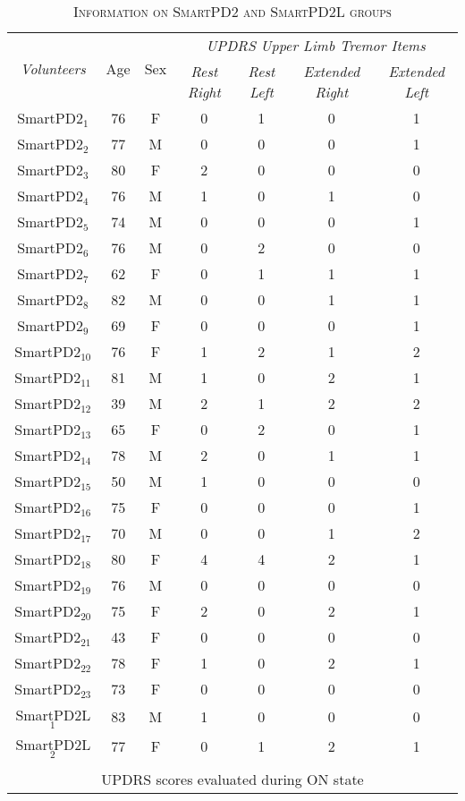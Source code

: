 \begin{table}[!hp]
\centering
\caption{\textsc{Information on SmartPD2 and SmartPD2L groups}}
\begin{tabular*}{1\textwidth}{@{\extracolsep{\fill}} c c c c c c c}
	\multirow{2}{*}{\textit{Volunteers}} & \multirow{2}{*}{Age} & \multirow{2}{*}{Sex} 
	& \multicolumn{4}{c}{\textit{UPDRS Upper Limb Tremor Items}} \\
	\cline{4-7}
	& & & \textit{Rest Right} & \textit{Rest Left} & \textit{Extended Right} & \textit{Extended Left} \\
	\hline 	\hline 
 	\gls{SmartPD2}$_{1}$ & 76 & F & 0 & 1 & 0 & 1 \\
 	\gls{SmartPD2}$_{2}$ & 77 & M & 0 & 0 & 0 & 1 \\
 	\gls{SmartPD2}$_{3}$ & 80 & F & 2 & 0 & 0 & 0 \\
 	\gls{SmartPD2}$_{4}$ & 76 & M & 1 & 0 & 1 & 0 \\
 	\gls{SmartPD2}$_{5}$ & 74 & M & 0 & 0 & 0 & 1 \\
 	\gls{SmartPD2}$_{6}$ & 76 & M & 0 & 2 & 0 & 0 \\
 	\gls{SmartPD2}$_{7}$ & 62 & F & 0 & 1 & 1 & 1 \\
 	\gls{SmartPD2}$_{8}$ & 82 & M & 0 & 0 & 1 & 1 \\
 	\gls{SmartPD2}$_{9}$ & 69 & F & 0 & 0 & 0 & 1 \\
 	\gls{SmartPD2}$_{10}$ & 76 & F & 1 & 2 & 1 & 2 \\
 	\gls{SmartPD2}$_{11}$ & 81 & M & 1 & 0 & 2 & 1 \\
 	\gls{SmartPD2}$_{12}$ & 39 & M & 2 & 1 & 2 & 2 \\
 	\gls{SmartPD2}$_{13}$ & 65 & F & 0 & 2 & 0 & 1 \\
 	\gls{SmartPD2}$_{14}$ & 78 & M & 2 & 0 & 1 & 1\\
 	\gls{SmartPD2}$_{15}$ & 50 & M & 1 & 0 & 0 & 0\\
 	\gls{SmartPD2}$_{16}$ & 75 & F & 0 & 0 & 0 & 1\\
 	\gls{SmartPD2}$_{17}$ & 70 & M & 0 & 0 & 1 & 2 \\
 	\gls{SmartPD2}$_{18}$ & 80 & F & 4 & 4 & 2 & 1 \\
 	\gls{SmartPD2}$_{19}$ & 76 & M & 0 & 0 & 0 & 0 \\
 	\gls{SmartPD2}$_{20}$ & 75 & F & 2 & 0 & 2 & 1 \\
 	\gls{SmartPD2}$_{21}$ & 43 & F & 0 & 0 & 0 & 0 \\
 	\gls{SmartPD2}$_{22}$ & 78 & F & 1 & 0 & 2 & 1 \\
 	\gls{SmartPD2}$_{23}$ & 73 & F & 0 & 0 & 0 & 0 \\
 	\hline
 	\gls{SmartPD2L}$_{1}$ & 83 & M & 1 & 0 & 0 & 0 \\
 	\gls{SmartPD2L}$_{2}$ & 77 & F & 0 & 1 & 2 & 1 \\
 	& & & & & & \\
	\multicolumn{7}{c}{\gls{UPDRS} scores evaluated during ON state} 	\\
\end{tabular*}
\label{table:demoSmartPD2}
\end{table}

